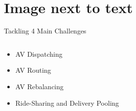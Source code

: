 \section[Image/Text 1]{Image next to text }

\begin{frame}{Tackling 4 Main Challenges}
	\begin{columns}
		\begin{column}{0.4\textwidth}
			
			\begin{itemize}
				\item \alert<1>{AV Dispatching}
				\item \alert<2>{AV Routing}
				\item \alert<3>{AV Rebalancing}
				\item \alert<4>{Ride-Sharing and Delivery Pooling}
			\end{itemize}
			
				
		\end{column}
		\begin{column}{0.6\textwidth}
			\only<1>{ %
				
			}
			\only<2>{ %
				
			}
			\only<3>{ %
				
			}
			\only<4>{ %
				
			}
		\end{column}
	\end{columns}
\end{frame}

